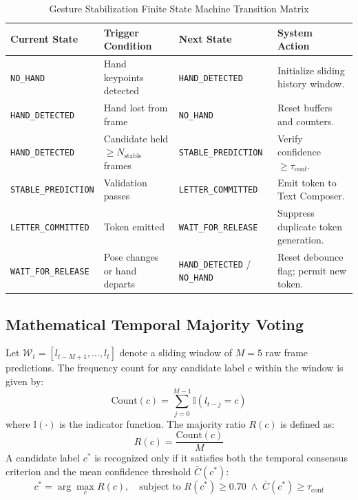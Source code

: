 \documentclass[12pt,a4paper]{report}
\begin{document}
\begin{table}[htbp]
\centering
\caption{Gesture Stabilization Finite State Machine Transition Matrix}
\label{tab:fsm_gesture}
\small
\begin{tabularx}{\textwidth}{P{3.4cm}P{3.2cm}P{3.6cm}L}
\toprule
\textbf{Current State} & \textbf{Trigger Condition} & \textbf{Next State} & \textbf{System Action} \\
\midrule
\texttt{NO\_HAND} & Hand keypoints detected & \texttt{HAND\_DETECTED} & Initialize sliding history window. \\
\texttt{HAND\_DETECTED} & Hand lost from frame & \texttt{NO\_HAND} & Reset buffers and counters. \\
\texttt{HAND\_DETECTED} & Candidate held $\ge N_{\text{stable}}$ frames & \texttt{STABLE\_PREDICTION} & Verify confidence $\ge \tau_{\text{conf}}$. \\
\texttt{STABLE\_PREDICTION} & Validation passes & \texttt{LETTER\_COMMITTED} & Emit token to Text Composer. \\
\texttt{LETTER\_COMMITTED} & Token emitted & \texttt{WAIT\_FOR\_RELEASE} & Suppress duplicate token generation. \\
\texttt{WAIT\_FOR\_RELEASE} & Pose changes or hand departs & \texttt{HAND\_DETECTED} / \texttt{NO\_HAND} & Reset debounce flag; permit new token. \\
\bottomrule
\end{tabularx}
\end{table}

\subsection{Mathematical Temporal Majority Voting}
Let $\mathcal{W}_t = [l_{t-M+1}, \dots, l_t]$ denote a sliding window of $M=5$ raw frame predictions. The frequency count for any candidate label $c$ within the window is given by:
\begin{equation}
\text{Count}(c) = \sum_{j=0}^{M-1} \mathbb{I}(l_{t-j} = c)
\end{equation}
where $\mathbb{I}(\cdot)$ is the indicator function. The majority ratio $R(c)$ is defined as:
\begin{equation}
R(c) = \frac{\text{Count}(c)}{M}
\end{equation}
A candidate label $c^*$ is recognized only if it satisfies both the temporal consensus criterion and the mean confidence threshold $\bar{C}(c^*)$:
\begin{equation}
c^* = \arg\max_c R(c), \quad \text{subject to } R(c^*) \ge 0.70 \;\land\; \bar{C}(c^*) \ge \tau_{\text{conf}}
\end{equation}
\end{document}
